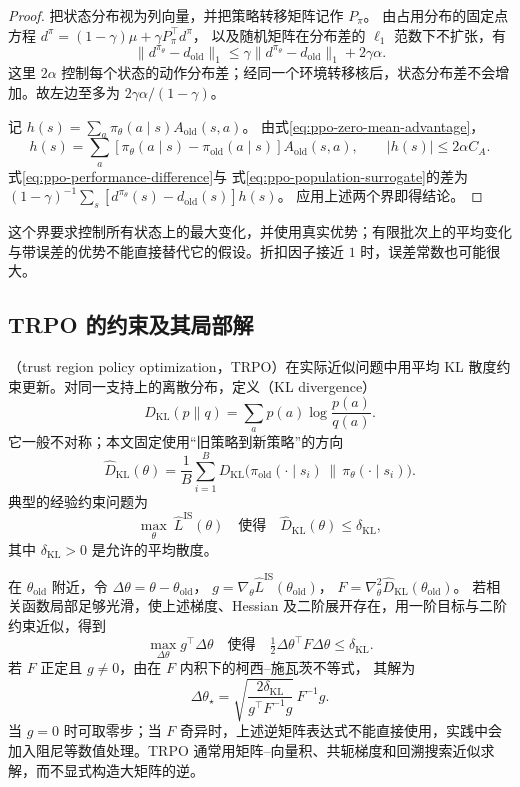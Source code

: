 \documentclass[UTF8]{ctexart}
\begin{document}
\begin{proof}
把状态分布视为列向量，并把策略转移矩阵记作 $P_\pi$。
由占用分布的固定点方程
$d^\pi=(1-\gamma)\mu+\gamma P_\pi^\top d^\pi$，
以及随机矩阵在分布差的 $\ell_1$ 范数下不扩张，有
\[
  \|d^{\pi_\theta}-d_{\mathrm{old}}\|_1
  \le\gamma\|d^{\pi_\theta}-d_{\mathrm{old}}\|_1+2\gamma\alpha.
\]
这里 $2\alpha$ 控制每个状态的动作分布差；经同一个环境转移核后，状态分布差不会增加。故左边至多为 $2\gamma\alpha/(1-\gamma)$。

记 $h(s)=\sum_a\pi_\theta(a\mid s)A_{\mathrm{old}}(s,a)$。
由式\eqref{eq:ppo-zero-mean-advantage}，
\[
  h(s)=\sum_a
  [\pi_\theta(a\mid s)-\pi_{\mathrm{old}}(a\mid s)]
  A_{\mathrm{old}}(s,a),
  \qquad |h(s)|\le2\alpha C_A.
\]
式\eqref{eq:ppo-performance-difference}与
式\eqref{eq:ppo-population-surrogate}的差为
$(1-\gamma)^{-1}\sum_s[d^{\pi_\theta}(s)-d_{\mathrm{old}}(s)]h(s)$。
应用上述两个界即得结论。
\end{proof}

这个界要求控制所有状态上的最大变化，并使用真实优势；有限批次上的平均变化与带误差的优势不能直接替代它的假设。折扣因子接近 $1$ 时，误差常数也可能很大。

\subsection{TRPO 的约束及其局部解}

（trust region policy optimization，TRPO）在实际近似问题中用平均 KL 散度约束更新。对同一支持上的离散分布，定义（KL divergence）
\[
  D_{\mathrm{KL}}(p\|q)=\sum_a p(a)\log\frac{p(a)}{q(a)}.
\]
它一般不对称；本文固定使用“旧策略到新策略”的方向
\[
  \widehat D_{\mathrm{KL}}(\theta)
  =\frac1B\sum_{i=1}^B
  D_{\mathrm{KL}}\bigl(\pi_{\mathrm{old}}(\cdot\mid s_i)
                      \,\|\,\pi_\theta(\cdot\mid s_i)\bigr).
\]
典型的经验约束问题为
\begin{equation}
  \max_\theta\ \widehat L^{\mathrm{IS}}(\theta)
  \quad\text{使得}\quad
  \widehat D_{\mathrm{KL}}(\theta)\le\delta_{\mathrm{KL}},
  \label{eq:ppo-trpo}
\end{equation}
其中 $\delta_{\mathrm{KL}}>0$ 是允许的平均散度。

在 $\theta_{\mathrm{old}}$ 附近，令
$\Delta\theta=\theta-\theta_{\mathrm{old}}$，
$g=\nabla_\theta\widehat L^{\mathrm{IS}}(\theta_{\mathrm{old}})$，
$F=\nabla_\theta^2\widehat D_{\mathrm{KL}}(\theta_{\mathrm{old}})$。
若相关函数局部足够光滑，使上述梯度、Hessian 及二阶展开存在，用一阶目标与二阶约束近似，得到
\[
  \max_{\Delta\theta}g^\top\Delta\theta
  \quad\text{使得}\quad
  \tfrac12\Delta\theta^\top F\Delta\theta\le\delta_{\mathrm{KL}}.
\]
若 $F$ 正定且 $g\ne0$，由在 $F$ 内积下的柯西--施瓦茨不等式，
其解为
\[
  \Delta\theta_\star=
  \sqrt{\frac{2\delta_{\mathrm{KL}}}{g^\top F^{-1}g}}\,
  F^{-1}g.
\]
当 $g=0$ 时可取零步；当 $F$ 奇异时，上述逆矩阵表达式不能直接使用，实践中会加入阻尼等数值处理。TRPO 通常用矩阵--向量积、共轭梯度和回溯搜索近似求解，而不显式构造大矩阵的逆。
\end{document}
